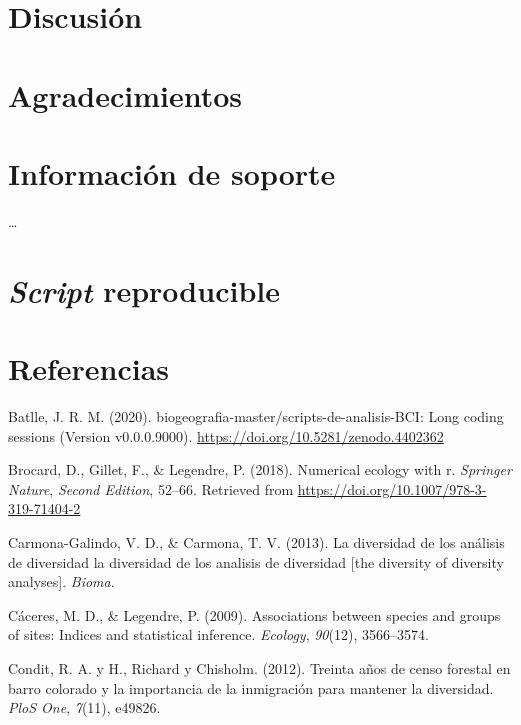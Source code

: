 \documentclass[11pt,]{article}
\begin{document}
\section{Discusión}\label{discusiuxf3n}

\section{Agradecimientos}\label{agradecimientos}

\section{Información de soporte}\label{informaciuxf3n-de-soporte}

\ldots

\section{\texorpdfstring{\emph{Script}
reproducible}{Script reproducible}}\label{script-reproducible}

\section*{Referencias}\label{referencias}

\hypertarget{refs}{}
\hypertarget{ref-jose_ramon_martinez_batlle_2020_4402362}{}
Batlle, J. R. M. (2020). biogeografia-master/scripts-de-analisis-BCI:
Long coding sessions (Version v0.0.0.9000).
\url{https://doi.org/10.5281/zenodo.4402362}

\hypertarget{ref-brocard2011numerical}{}
Brocard, D., Gillet, F., \& Legendre, P. (2018). Numerical ecology with
r. \emph{Springer Nature}, \emph{Second Edition}, 52--66. Retrieved from
\url{https://doi.org/10.1007/978-3-319-71404-2}

\hypertarget{ref-carmona2013diversidad}{}
Carmona-Galindo, V. D., \& Carmona, T. V. (2013). La diversidad de los
análisis de diversidad la diversidad de los analisis de diversidad
{[}the diversity of diversity analyses{]}. \emph{Bioma}.

\hypertarget{ref-caceres2009associations}{}
Cáceres, M. D., \& Legendre, P. (2009). Associations between species and
groups of sites: Indices and statistical inference. \emph{Ecology},
\emph{90}(12), 3566--3574.

\hypertarget{ref-condit2012thirty}{}
Condit, R. A. y H., Richard y Chisholm. (2012). Treinta años de censo
forestal en barro colorado y la importancia de la inmigración para
mantener la diversidad. \emph{PloS One}, \emph{7}(11), e49826.
\end{document}
